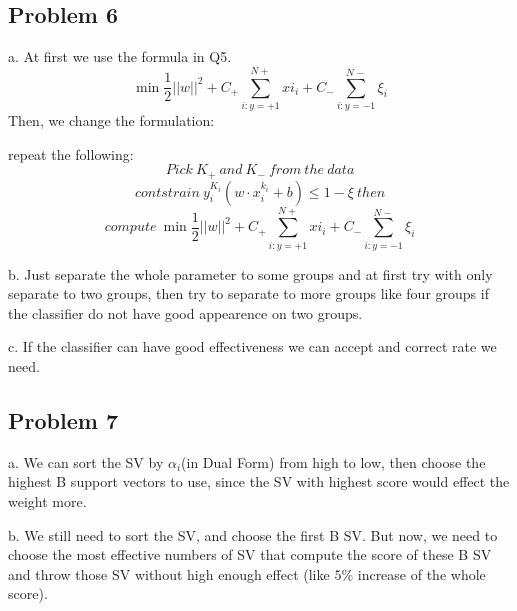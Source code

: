 \documentclass[12pt]{article}
\begin{document}
        \subsection{Problem 6}
            \par\qquad a. At first we use the formula in Q5.
            \[\min\frac{1}{2}||w||^2+C_+\sum_{i:y=+1}^{N+}xi_i+C_-\sum_{i:y=-1}^{N-}\xi_i\]
            Then, we change the formulation:
            \par repeat the following:
            \[ Pick\ K_+\ and\ K_-\ from\ the\ data\]
            \[ contstrain\ y_i^{K_i}(w\cdot x_i^{k_i}+b)\le1-\xi\ then\]
            \[ compute\ \min\frac{1}{2}||w||^2+C_+\sum_{i:y=+1}^{N+}xi_i+C_-\sum_{i:y=-1}^{N-}\xi_i\]
            \par b. Just separate the whole parameter to some groups and at first try with only separate to two groups,
            then try to separate to more groups like four groups if the classifier do not have good appearence on two groups.
            \par c. If the classifier can have good effectiveness we can accept and correct rate we need.
        \subsection{Problem 7}
            \par\qquad a. We can sort the SV by $\alpha_i$(in Dual Form) from high to low, then choose the highest B support vectors to use,
            since the SV with highest score would effect the weight more.
            \par b. We still need to sort the SV, and choose the first B SV. But now, we need to choose
            the most effective numbers of SV that compute the score of these B SV and throw those SV
            without high enough effect (like $ 5\% $ increase of the whole score).
\end{document}
